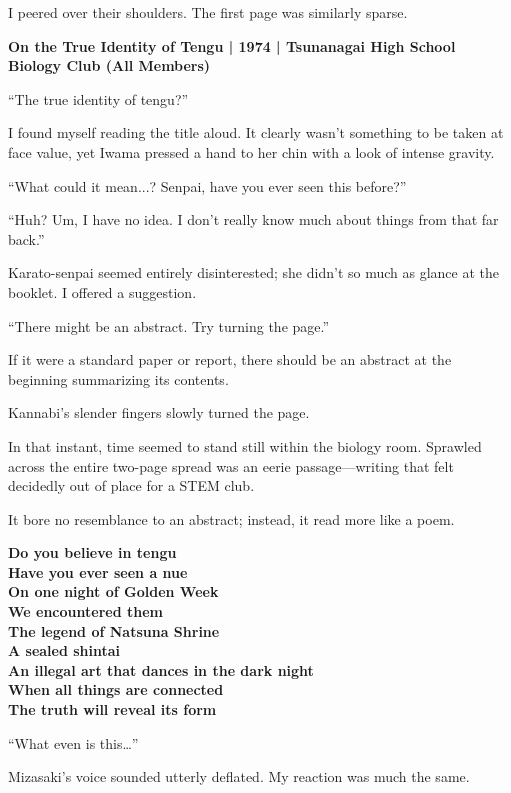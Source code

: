 \documentclass[
    a4paper,
    12pt,
    twoside,
    openany,
    UTF8,
    fontset=windows
]{ctexbook}
\begin{document}
I peered over their shoulders. The first page was similarly sparse.

\textbf{On the True Identity of Tengu | 1974 | Tsunanagai High School Biology Club (All Members)}

``The true identity of tengu?''

I found myself reading the title aloud. It clearly wasn't something to be taken at face value, yet Iwama pressed a hand to her chin with a look of intense gravity.

``What could it mean...? Senpai, have you ever seen this before?''

``Huh? Um, I have no idea. I don't really know much about things from that far back.''

Karato-senpai seemed entirely disinterested; she didn't so much as glance at the booklet. I offered a suggestion.

``There might be an abstract. Try turning the page.''

If it were a standard paper or report, there should be an abstract at the beginning summarizing its contents.

Kannabi's slender fingers slowly turned the page.

In that instant, time seemed to stand still within the biology room. Sprawled across the entire two-page spread was an eerie passage---writing that felt decidedly out of place for a STEM club.

It bore no resemblance to an abstract; instead, it read more like a poem.

\begin{center}

{\bfseries
Do you believe in tengu\\
Have you ever seen a nue\\
On one night of Golden Week\\
We encountered them\\
The legend of Natsuna Shrine\\
A sealed shintai\\
An illegal art that dances in the dark night\\
When all things are connected\\
The truth will reveal its form

}
\end{center}

``What even is this\dots''

Mizasaki's voice sounded utterly deflated. My reaction was much the same.
\end{document}
